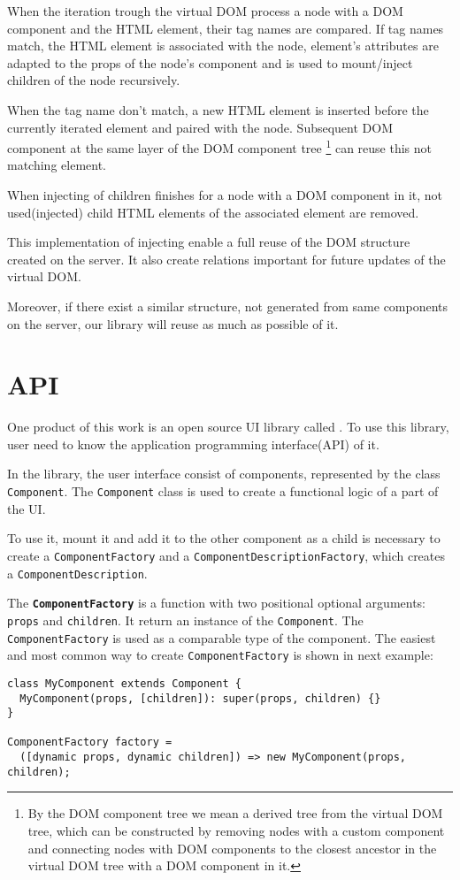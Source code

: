 \documentclass[oneside, 12pt]{book}
\begin{document}
    When the iteration trough the virtual DOM process a node with a DOM component and the HTML element,
    their tag names are compared.
    If tag names match, the HTML element is associated with the node, 
    element's attributes are adapted to the props of the node's component 
    and is used to mount/inject children of the node recursively.

    When the tag name don't match, 
    a new HTML element is inserted before the currently iterated element and paired with the node. 
    Subsequent DOM component at the same layer of the DOM component tree
    \footnote{
      By the DOM component tree we mean a derived tree from the virtual DOM tree, 
      which can be constructed by removing nodes with a custom component
      and connecting nodes with DOM components to the closest ancestor in the virtual DOM tree with a DOM component in it.
    }
    can reuse this not matching element.

    When injecting of children finishes for a node with a DOM component in it, 
    not used(injected) child HTML elements of the associated element are removed.

    This implementation of injecting enable a full reuse of the DOM structure created on the server.
    It also create relations important for future updates of the virtual DOM. 

    Moreover, if there exist a similar structure, not generated from same components on the server, 
    our library will reuse as much as possible of it.

\section{API}\label{sec:our-api}

  One product of this work is an open source UI library called \tiles.
  To use this library, user need to know the application programming interface(API) of it. 

  In the \tiles library, the user interface consist of components, represented by the class \texttt{Component}. 
	The \texttt{Component} class is used to create a functional logic of a part of the UI. 

  To use it, mount it and add it to the other component as a child is necessary to create a \texttt{ComponentFactory} 
  and a \texttt{ComponentDescriptionFactory}, which creates a \texttt{ComponentDescription}.

  The \textbf{\texttt{ComponentFactory}} is a function with two positional optional arguments: \texttt{props} and \texttt{children}.
	It return an instance of the \texttt{Component}. The \texttt{ComponentFactory} is used as a comparable type of the component.
	The easiest and most common way to create \texttt{ComponentFactory} is shown in next example:
\begin{verbatim}
class MyComponent extends Component {
  MyComponent(props, [children]): super(props, children) {}
}

ComponentFactory factory = 
  ([dynamic props, dynamic children]) => new MyComponent(props, children);
\end{verbatim}
\end{document}
